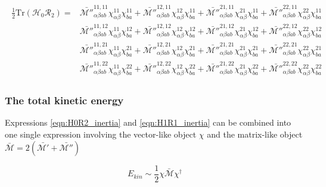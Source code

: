 \begin{tcolorbox}
\begin{align}\label{eqn:H1R1_inertia}
\begin{aligned}
\frac{1}{2}\mathrm{Tr}\left(\mathcal{H}_0\mathcal{R}_2\right) = &
 \mathcal{\bar{M''}}^{11,11}_{\alpha\beta ab}\chi^{11}_{\alpha\beta}\chi^{11}_{ba} +
 \mathcal{\bar{M''}}^{12,11}_{\alpha\beta ab}\chi^{12}_{\alpha\beta}\chi^{11}_{ba} +
 \mathcal{\bar{M''}}^{21,11}_{\alpha\beta ab}\chi^{21}_{\alpha\beta}\chi^{11}_{ba} +
 \mathcal{\bar{M''}}^{22,11}_{\alpha\beta ab}\chi^{22}_{\alpha\beta}\chi^{11}_{ba} \\
&
 \mathcal{\bar{M''}}^{11,12}_{\alpha\beta ab}\chi^{11}_{\alpha\beta}\chi^{12}_{ba} +
 \mathcal{\bar{M''}}^{12,12}_{\alpha\beta ab}\chi^{12}_{\alpha\beta}\chi^{12}_{ba} +
 \mathcal{\bar{M''}}^{21,12}_{\alpha\beta ab}\chi^{21}_{\alpha\beta}\chi^{12}_{ba} +
 \mathcal{\bar{M''}}^{22,12}_{\alpha\beta ab}\chi^{22}_{\alpha\beta}\chi^{12}_{ba} \\
&
 \mathcal{\bar{M''}}^{11,21}_{\alpha\beta ab}\chi^{11}_{\alpha\beta}\chi^{21}_{ba} +
 \mathcal{\bar{M''}}^{12,21}_{\alpha\beta ab}\chi^{12}_{\alpha\beta}\chi^{21}_{ba} +
 \mathcal{\bar{M''}}^{21,21}_{\alpha\beta ab}\chi^{21}_{\alpha\beta}\chi^{21}_{ba} +
 \mathcal{\bar{M''}}^{22,21}_{\alpha\beta ab}\chi^{22}_{\alpha\beta}\chi^{21}_{ba} \\
&
 \mathcal{\bar{M''}}^{11,22}_{\alpha\beta ab}\chi^{11}_{\alpha\beta}\chi^{22}_{ba} +
 \mathcal{\bar{M''}}^{12,22}_{\alpha\beta ab}\chi^{12}_{\alpha\beta}\chi^{22}_{ba} +
 \mathcal{\bar{M''}}^{21,22}_{\alpha\beta ab}\chi^{21}_{\alpha\beta}\chi^{22}_{ba} +
 \mathcal{\bar{M''}}^{22,22}_{\alpha\beta ab}\chi^{22}_{\alpha\beta}\chi^{22}_{ba}
\end{aligned}
\end{align}
\end{tcolorbox}

\subsubsection{The total kinetic energy}

Expressions \ref{eqn:H0R2_inertia} and \ref{eqn:H1R1_inertia} can be combined into one single expression involving the vector-like object $\chi$ and the matrix-like object $\mathcal{\bar{M}}=2(\mathcal{\bar{M'}+\bar{M''}})$

\begin{equation}
E_{kin} \sim \frac{1}{2}\chi\mathcal{\bar{M}}\chi^\dagger
\end{equation}

